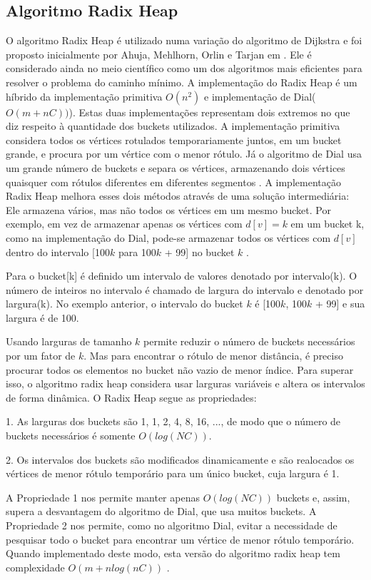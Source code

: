 \subsection{Algoritmo Radix Heap}
O algoritmo Radix Heap é utilizado numa variação do algoritmo de Dijkstra e foi proposto inicialmente por
Ahuja, Mehlhorn, Orlin e Tarjan em \cite{ahuja}.
Ele é considerado ainda no meio científico como um dos algoritmos mais eficientes para resolver o
problema do caminho mínimo.
A implementação do Radix Heap é um híbrido da implementação primitiva $O(n^2)$ e implementação de Dial($O(m + nC))$). 
Estas duas implementações representam dois extremos no que diz respeito à quantidade dos buckets utilizados.
A implementação primitiva considera todos os vértices rotulados temporariamente juntos, em um bucket grande,
e procura por um vértice com o menor rótulo. Já o algoritmo de Dial usa um grande número de buckets e separa os vértices,
armazenando dois vértices quaisquer com rótulos diferentes em diferentes segmentos \cite{bookahuja}.
A implementação Radix Heap melhora esses dois métodos através de uma solução intermediária:
Ele armazena vários, mas não todos os vértices em um mesmo bucket. Por exemplo, em vez de armazenar
apenas os vértices com $d[v] = k$ em um bucket k, como na implementação do Dial,
pode-se armazenar todos os vértices com $d[v]$ dentro do intervalo [100$k$ para 100$k$ + 99] no bucket $k$ \cite{bookahuja}.

Para o bucket[k] é definido um intervalo de valores denotado por intervalo(k). O número de inteiros
no intervalo é chamado de largura do intervalo e denotado por largura(k).
No exemplo anterior, o intervalo do bucket $k$ é [100$k$, 100$k$ + 99] e sua largura é de 100. 

Usando larguras de tamanho $k$ permite reduzir o número de buckets necessários por um fator de $k$.
Mas para encontrar o rótulo de menor distância, é preciso procurar todos os elementos no bucket não vazio de menor índice.
Para superar isso, o algoritmo radix heap considera usar larguras variáveis e altera os intervalos de forma dinâmica. 
O Radix Heap segue as propriedades:

1. As larguras dos buckets são 1, 1, 2, 4, 8, 16, ..., de modo que o número de buckets necessários é somente $O(log(NC))$.

2.  Os intervalos dos buckets são modificados dinamicamente e são realocados os vértices de menor rótulo temporário
para um único bucket, cuja largura é 1.

A Propriedade 1 nos permite manter apenas $O(log(NC))$ buckets e, assim, supera a desvantagem do algoritmo
de Dial, que usa muitos buckets.
A Propriedade 2 nos permite, como no algoritmo Dial, evitar a necessidade de 
pesquisar todo o bucket para encontrar um vértice de menor rótulo temporário. Quando implementado deste modo, esta 
versão do algoritmo radix heap tem complexidade $O(m + nlog(nC))$ \cite{bookahuja}.

